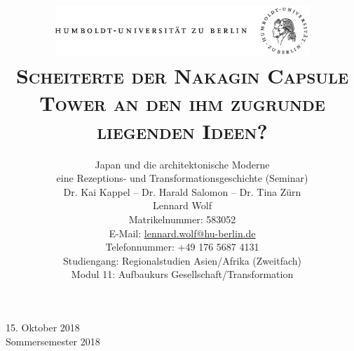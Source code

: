 \documentclass[a4paper, 12pt]{article}
\date{\vspace{-3ex}}
\begin{document}
\title{\vspace{5ex}
	\includegraphics*[bb=0 0 720 200, width=0.72\textwidth]{ErstesSem/images/hu_logo.png}\\
	\vspace{30pt}
	\scshape\LARGE{Scheiterte der Nakagin Capsule Tower an den ihm zugrunde liegenden Ideen?}\\\vspace{20pt}}
\author{Japan und die architektonische Moderne\\eine Rezeptions- und Transformationsgeschichte (Seminar)\\
	\vspace{7pt}
          Dr. Kai Kappel -- Dr. Harald Salomon -- Dr. Tina Zürn\\\vspace{4pt}Lennard Wolf\\
        \small{Matrikelnummer: 583052}\\
        \small{E-Mail: \href{mailto:lennard.wolf@hu-berlin.de}{lennard.wolf@hu-berlin.de}}\\
        \small{Telefonnummer: +49 176 5687 4131}\\
        \small{Studiengang: Regionalstudien Asien/Afrika (Zweitfach)}\\
        \small{Modul 11: Aufbaukurs Gesellschaft/Transformation}}

\maketitle

\vspace{\fill}

\begin{minipage}[]{0.92\textwidth}
    \centering
    \onehalfspacing
    \large   
    15. Oktober 2018\\
    Sommersemester 2018

    \vspace{-20mm} 
\end{minipage}%
\thispagestyle{empty}
\newpage
\setcounter{page}{1}
\end{document}
